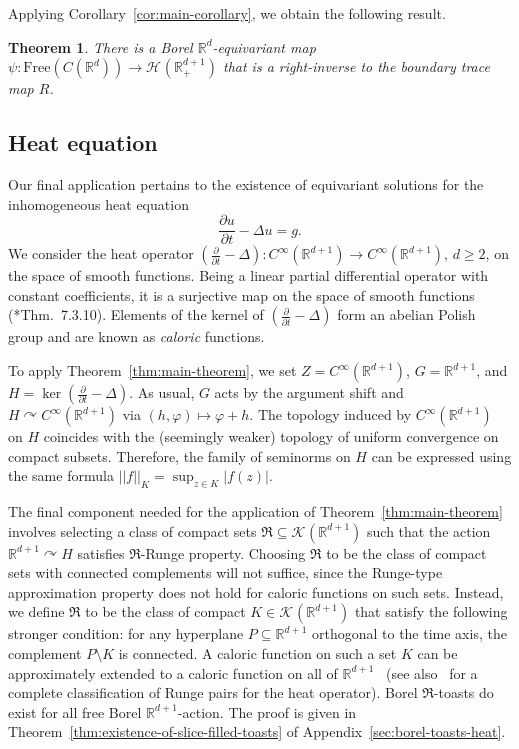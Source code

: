\documentclass[12pt]{paper}
\numberwithin{equation}{section}
\theoremstyle{plain}
\newtheorem{theorem}{Theorem}[section]
\theoremstyle{definition}
\newcommand{\R}{\mathbb{R}}
\newcommand{\Rd}{\mathbb{R}^{d}}
\newcommand{\mfR}{\mathfrak{R}}
\newcommand{\vietoris}[2][]{\mathcal{K}_{#1}(#2)}
\newcommand{\smooth}[2][]{C^{\infty}_{#1}(#2)}
\newcommand{\harm}[2][]{\mathcal{H}_{#1}(#2)}
\newcommand{\acts}{\curvearrowright}
\newcommand{\norm}[1]{||#1||}
\newcommand{\free}{\mathrm{Free}}
\renewcommand{\phi}{\varphi}
\begin{document}
Applying Corollary~\ref{cor:main-corollary}, we obtain the following result.

\begin{theorem}
\label{thm:Dirichlet}
There is a Borel \(\Rd\)-equivariant map
\(\psi\colon \free(C(\Rd)) \to \harm{\R^{d+1}_+}\) that is a right-inverse to the boundary trace map
\( R \).
\end{theorem}

\subsection{Heat equation}
\label{sec:heat-equation}

Our final application pertains to the existence of equivariant solutions for the inhomogeneous heat
equation
\begin{equation}
  \label{eq:heat-equation}
  \frac{\partial u}{\partial t} - \Delta u = g.
\end{equation}
We consider the heat operator
\((\frac{\partial }{\partial t} - \Delta) : \smooth{\R^{d+1}} \to \smooth{\R^{d+1}}\), \(d \ge 2\),
on the space of smooth functions.  Being a linear partial differential operator with constant
coefficients, it is a surjective map on the space of smooth functions
(\cite{hormanderAnalysisLinearPartial2003}*{Thm.~7.3.10}).  Elements of the kernel of
\((\frac{\partial }{\partial t} - \Delta)\) form an abelian Polish group and are known as
\emph{caloric} functions.

To apply Theorem~\ref{thm:main-theorem}, we set \(Z = \smooth{\R^{d+1}}\), \(G = \R^{d+1}\), and
\(H = \ker (\frac{\partial }{\partial t} - \Delta)\).  As usual, \(G\) acts by the argument shift
and \(H \acts \smooth{\R^{d+1}}\) via \((h,\phi) \mapsto \phi + h\).  The topology induced by
\(\smooth{\R^{d+1}}\) on \(H\) coincides with the (seemingly weaker) topology of uniform convergence
on compact subsets.  Therefore, the family of seminorms on \(H\) can be expressed using the same
formula \(\norm{f}_{K} = \sup_{z \in K}|f(z)|\).


The final component needed for the application of Theorem~\ref{thm:main-theorem} involves selecting
a class of compact sets \(\mfR \subseteq \vietoris{\R^{d+1}}\) such that the action
\(\R^{d+1} \acts H\) satisfies \(\mfR\)-Runge property.  Choosing \(\mfR\) to be the class of
compact sets with connected complements will not suffice, since the Runge-type approximation
property does not hold for caloric functions on such sets.  Instead, we define \(\mfR\) to be the
class of compact \(K \in \vietoris{\R^{d+1}}\) that satisfy the following stronger condition: for
any hyperplane \(P \subseteq \R^{d+1}\) orthogonal to the time axis, the complement
\(P \setminus K\) is connected.  A caloric function on such a set \(K\) can be approximately
extended to a caloric function on all of \(\R^{d+1}\)~\cite{jonesApproximationTheoremRunge1975} (see
also~\cite{diazRungeTheoremSolutions1980} for a complete classification of Runge pairs for the heat
operator).  Borel \(\mfR\)-toasts do exist for all free Borel \(\R^{d+1}\)-action.  The proof is
given in Theorem~\ref{thm:existence-of-slice-filled-toasts} of Appendix~\ref{sec:borel-toasts-heat}.
\end{document}
